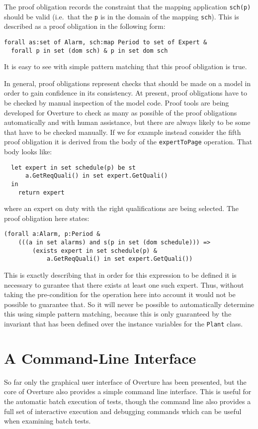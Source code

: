 The proof obligation records the constraint that the mapping application \texttt{sch(p)} should be valid (i.e.\ that the \texttt{p} is in the domain of the mapping \texttt{sch}). This is described as a proof obligation in the following form:

\begin{lstlisting}
forall as:set of Alarm, sch:map Period to set of Expert &
  forall p in set (dom sch) & p in set dom sch
\end{lstlisting}
It is easy to see with simple pattern matching that this proof obligation is true.

In general, proof obligations represent checks that should be made on a model in order to gain confidence in its consistency. At present, proof obligations have to be checked by manual inspection of the model code. Proof tools are being developed for Overture to check as many as possible of the proof obligations automatically and with human assistance, but there are always likely to be some that have to be checked manually. If we for example instead consider the fifth proof obligation it is derived from the body of the \texttt{expertToPage} operation. That body looks like:

\begin{lstlisting}
  let expert in set schedule(p) be st
      a.GetReqQuali() in set expert.GetQuali()
  in
    return expert
\end{lstlisting}

\noindent where an expert on duty with the right qualifications are
being selected. The proof obligation here states:

\begin{lstlisting}
(forall a:Alarm, p:Period &
	(((a in set alarms) and s(p in set (dom schedule))) => 
		(exists expert in set schedule(p) &
			a.GetReqQuali() in set expert.GetQuali())
\end{lstlisting}

\noindent This is exactly describing that in order for this expression to be defined it is necessary to gurantee that there exists at least one such expert. Thus, without taking the pre-condition for the operation here into account it would not be possible to guarantee that. So it will never be possible to automatically determine this using simple pattern matching, because this is only guaranteed by the invariant that has been defined over the instance variables for the \texttt{Plant} class.
%
\section{A Command-Line Interface}\label{sec:cmdline}
So far only the graphical user interface of Overture has been presented, but the core of Overture also provides a simple command line interface.  This is useful for the automatic batch execution of tests, though the command line also provides a full set of interactive execution and debugging commands which can be useful when examining batch tests. 

